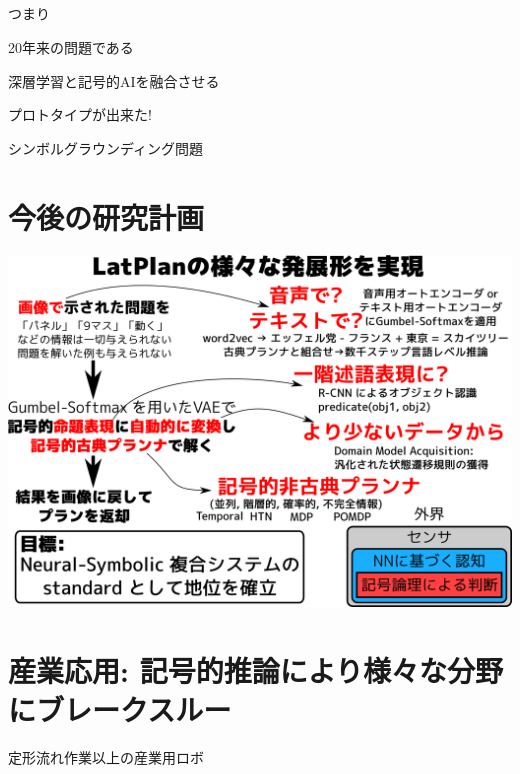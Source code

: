 \subsection{}
\label{sec:orgheadline42}

\begin{xlarge}
つまり
\end{xlarge}

20年来の問題である

\begin{xlarge}
\begin{center}
深層学習と記号的AIを融合させる
\end{center}
\begin{alignright}
プロトタイプが出来た!
\end{alignright}
\end{xlarge}

\begin{note}
シンボルグラウンディング問題
\end{note}

\section{今後の研究計画}
\label{sec:orgheadline44}

\includegraphics{img/keps17-4.png}

\section{産業応用: \textbf{記号的推論により様々な分野にブレークスルー}}
\label{sec:orgheadline45}

\begin{xlarge}
定形流れ作業以上の産業用ロボ
\end{xlarge}

